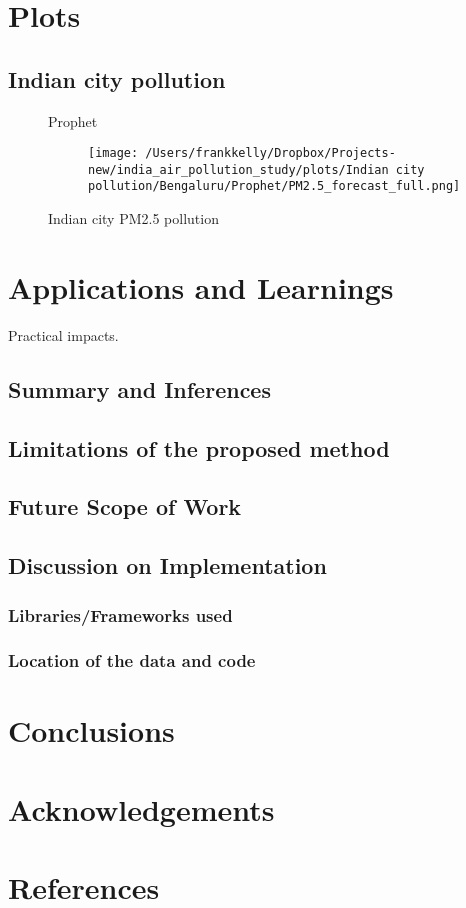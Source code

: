 \documentclass[manuscript,screen,nonacm,11pt]{acmart}                                                          %
\numberwithin{equation}{section}
\begin{document}
\section{Plots}
\label{sec:plots}
\subsection{Indian city pollution}
\label{sec:indiancitypollution}
\begin{figure}[H]
	\centering
	\begin{description}
		\item[Prophet] \texttt{[image: /Users/frankkelly/Dropbox/Projects-new/india\_air\_pollution\_study/plots/Indian city pollution/Bengaluru/Prophet/PM2.5\_forecast\_full.png]}
	\end{description}
	\caption{Indian city PM2.5 pollution}	
	\label{fig:indiancitypollution}
\end{figure}



\section{Applications and Learnings}
\label{sec:appln}
Practical impacts.
\subsection{Summary and Inferences}
\subsection{Limitations of the proposed method}
\subsection{Future Scope of Work}
\subsection{Discussion on Implementation}
\subsubsection{Libraries/Frameworks used}
\subsubsection{Location of the data and code} 

\section{Conclusions}
\label{sec:concl}

\section*{Acknowledgements}

\section*{References}
\begin{thebibliography}{10}
\end{thebibliography}
\end{document}
